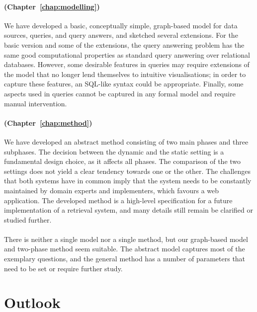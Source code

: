 \paragraph{\RQ[4] (Chapter~\ref{chap:modelling})}

We have developed a basic, conceptually simple, graph-based model for data sources, queries, and query answers,
and sketched several extensions. For the basic version and some of the extensions,
the query answering problem has the same
good computational properties as standard query answering over relational databases.
However, some desirable features in queries may require extensions of the model that no longer lend themselves
to intuitive visualisations; in order to capture these features, an \gls{SQL}-like syntax could be appropriate.
Finally, some aspects used in queries cannot be captured in any formal model
and require manual intervention.

\paragraph{\RQ[5] (Chapter~\ref{chap:method})}

We have developed an abstract method consisting of two main phases and three subphases.
The decision between the dynamic and the static setting is a fundamental design choice,
as it affects all phases. The comparison of the two settings does not yield a clear tendency
towards one or the other. The challenges that both systems have in common imply
that the system needs to be constantly maintained by domain experts and implementers,
which favours a web application.
The developed method is a high-level specification for a future implementation of a retrieval system,
and many details still remain be clarified or studied further.

\paragraph{\RQ}

There is neither a single model nor a single method,
but our graph-based model and two-phase method seem suitable.
The abstract model captures most of the exemplary questions, 
and the general method has a number of parameters
that need to be set or require further study.

\section{Outlook}
\label{sec:outlook}

